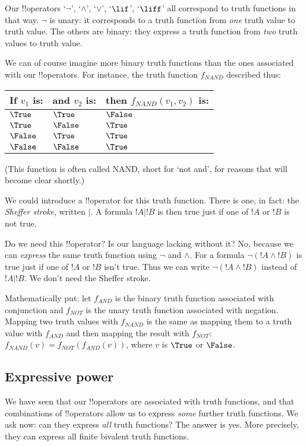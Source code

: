 \documentclass[../../../include/open-logic-section]{subfiles}
\begin{document}
Our !!{operator}s `$\lnot$', `$\land$', `$\lor$', `$\lif$', `$\liff$' all 
correspond to truth functions in that way. $\lnot$ is unary: it
corresponds to a truth function from \emph{one} truth value to truth
value. The others are binary: they express a truth function from
\emph{two} truth values to truth value.

We can of course imagine more binary truth functions than the ones
associated with our !!{operator}s. For instance,
the truth function $f_{NAND}$ described thus:
\smallskip
\begin{tabular}{lll}
    If $v_1$ is: & and $v_2$ is: & then $f_{NAND}(v_1,v_2)$ is: \\
    \hline
    $\True$ & $\True$ & $\False$ \\
    $\True$ & $\False$ & $\True$ \\
    $\False$ & $\True$ & $\True$ \\
    $\False$ & $\False$ & $\True$ \\
\end{tabular}
\smallskip

(This function is often called NAND, short for `not and', for reasons 
that will become clear shortly.)

We could introduce a !!{operator} for this truth function. There is one,
in fact: the \emph{Sheffer stroke}, written $|$. A formula $!A|!B$ is
then true just if one of $!A$ or $!B$ is not true. 

Do we need this !!{operator}? Is our language lacking without it? No,
because we can \emph{express} the same truth function using $\lnot$
and $\land$. For a formula $\lnot (!A\land!B)$ is true just if one of
$!A$ or $!B$ isn't true. Thus we can write $\lnot (!A\land!B)$ instead
of $!A|!B$. We don't need the Sheffer stroke. 

Mathematically put: let $f_{AND}$ is the binary truth function 
associated with conjunction and $f_{NOT}$ is the unary truth function 
associated with negation. Mapping two truth values with $f_{NAND}$ is
the same as mapping them to a truth value with $f_{AND}$ and then 
mapping the result with $f_{NOT}$: $f_{NAND}(v)=f_{NOT}(f_{AND}(v))$, 
where $v$ is $\True$ or $\False$.

\subsection{Expressive power}

We have seen that our !!{operator}s are associated with truth functions,
and that combinations of !!{operator}s allow us to express \emph{some}
further truth functions. We ask now: can they express \emph{all} truth
functions? The answer is yes. More precisely, they can express all
finite bivalent truth functions. 
\end{document}

